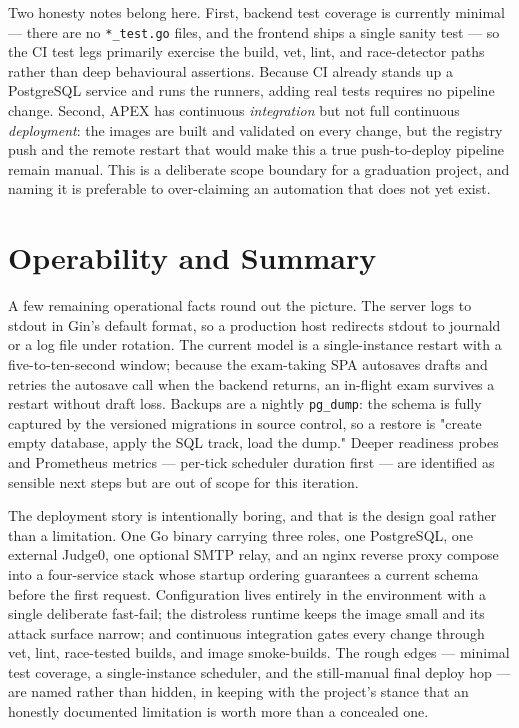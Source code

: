Two honesty notes belong here. First, backend test coverage is currently minimal --- there are no \texttt{*\_test.go} files, and the frontend ships a single sanity test --- so the CI test legs primarily exercise the build, vet, lint, and race-detector paths rather than deep behavioural assertions. Because CI already stands up a PostgreSQL service and runs the runners, adding real tests requires no pipeline change. Second, APEX has continuous \emph{integration} but not full continuous \emph{deployment}: the images are built and validated on every change, but the registry push and the remote restart that would make this a true push-to-deploy pipeline remain manual. This is a deliberate scope boundary for a graduation project, and naming it is preferable to over-claiming an automation that does not yet exist.

\section{Operability and Summary}

A few remaining operational facts round out the picture. The server logs to stdout in Gin's default format, so a production host redirects stdout to journald or a log file under rotation. The current model is a single-instance restart with a five-to-ten-second window; because the exam-taking SPA autosaves drafts and retries the autosave call when the backend returns, an in-flight exam survives a restart without draft loss. Backups are a nightly \texttt{pg\_dump}: the schema is fully captured by the versioned migrations in source control, so a restore is "create empty database, apply the SQL track, load the dump." Deeper readiness probes and Prometheus metrics --- per-tick scheduler duration first --- are identified as sensible next steps but are out of scope for this iteration.

The deployment story is intentionally boring, and that is the design goal rather than a limitation. One Go binary carrying three roles, one PostgreSQL, one external Judge0, one optional SMTP relay, and an nginx reverse proxy compose into a four-service stack whose startup ordering guarantees a current schema before the first request. Configuration lives entirely in the environment with a single deliberate fast-fail; the distroless runtime keeps the image small and its attack surface narrow; and continuous integration gates every change through vet, lint, race-tested builds, and image smoke-builds. The rough edges --- minimal test coverage, a single-instance scheduler, and the still-manual final deploy hop --- are named rather than hidden, in keeping with the project's stance that an honestly documented limitation is worth more than a concealed one.
